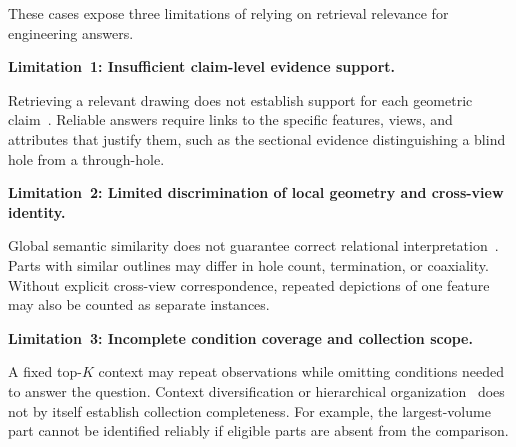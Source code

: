 \documentclass[preprint,12pt]{elsarticle}
\begin{document}
These cases expose three limitations of relying on retrieval relevance for engineering answers.

\textbf{Limitation~1: Insufficient claim-level evidence support.}\par\nopagebreak
Retrieving a relevant drawing does not establish support for each geometric claim~\cite{gao2023alce,gao2022rarr}. Reliable answers require links to the specific features, views, and attributes that justify them, such as the sectional evidence distinguishing a blind hole from a through-hole.

\textbf{Limitation~2: Limited discrimination of local geometry and cross-view identity.}\par\nopagebreak
Global semantic similarity does not guarantee correct relational interpretation~\cite{thrush2022winoground}. Parts with similar outlines may differ in hole count, termination, or coaxiality. Without explicit cross-view correspondence, repeated depictions of one feature may also be counted as separate instances.

\textbf{Limitation~3: Incomplete condition coverage and collection scope.}\par\nopagebreak
A fixed top-$K$ context may repeat observations while omitting conditions needed to answer the question. Context diversification or hierarchical organization~\cite{carbonell1998mmr,sarthi2024raptor,edge2024graphrag} does not by itself establish collection completeness. For example, the largest-volume part cannot be identified reliably if eligible parts are absent from the comparison.
\end{document}
